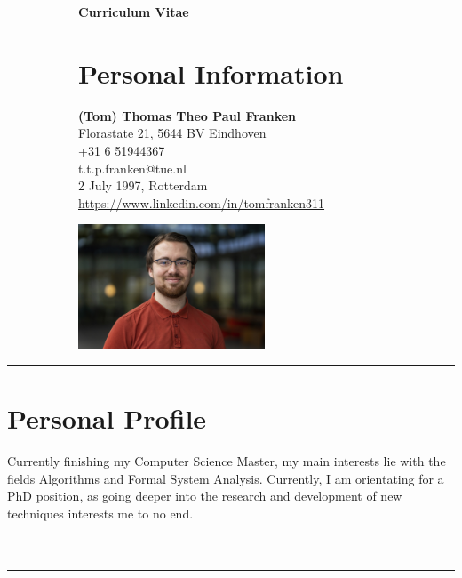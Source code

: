 \documentclass[11pt]{article}
\begin{document}
	\begin{figure}[h]
		\begin{subfigure}[t]{0.65\textwidth}
			\vskip 0pt
			\textbf{\Huge{Curriculum Vitae}} \hfill \textit{\color{Blue}{\Large{\today}}}\\
			\section*{Personal Information}
			\textit{\color{Blue}{Name}} \hfill \textbf{(Tom) Thomas Theo Paul Franken}\\
			\textit{\color{Blue}{Address}} \hfill Florastate 21, 5644 BV Eindhoven\\
			\textit{\color{Blue}{Phone}} \hfill +31 6 51944367\\
			\textit{\color{Blue}{Mail Address}} \hfill t.t.p.franken@tue.nl\\
			\textit{\color{Blue}{Birth Date \& Place}} \hfill 2 July 1997, Rotterdam\\
			\textit{\color{Blue}{LinkedIn}} \hfill \href{https://www.linkedin.com/in/tomfranken311}{https://www.linkedin.com/in/tomfranken311}
		\end{subfigure}
		\begin{subfigure}[t]{0.35\textwidth}
			\vskip 0pt
			\includegraphics[height=140px, right, trim={4cm 0 6cm 0},clip]{Tom Franken.jpg}
		\end{subfigure}
	\end{figure}
	\noindent\rule{\textwidth}{0.4pt}
	\section*{Personal Profile}
	\noindent Currently finishing my Computer Science Master, my main interests lie with the fields Algorithms and Formal System Analysis. Currently, I am orientating for a PhD position, as going deeper into the research and development of new techniques interests me to no end.
	\ \\\ \\\ \\
	\noindent\rule{\textwidth}{0.4pt}
\end{document}

